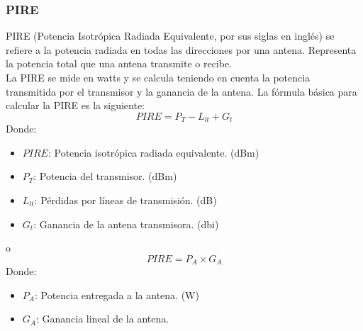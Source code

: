 \documentclass[
	12pt, %
	fleqn, %
	a4paper, %
	oneside, %
]{LegrandOrangeBook}
\begin{document}
\subsubsection{PIRE}
PIRE (Potencia Isotrópica Radiada Equivalente, por sus siglas en inglés) se refiere a la potencia radiada en todas las direcciones por una antena. Representa la potencia total que una antena transmite o recibe.\\
La PIRE se mide en watts y se calcula teniendo en cuenta la potencia transmitida por el transmisor y la ganancia de la antena. La fórmula básica para calcular la PIRE es la siguiente:
\begin{equation}
PIRE=P_T-L_{lt}+G_t
\end{equation}
Donde:
\begin{itemize}
\item $PIRE$: Potencia isotrópica radiada equivalente. (dBm)
\item $P_T$: Potencia del transmisor. (dBm)
\item $L_{lt}$: Pérdidas por líneas de transmisión. (dB)
\item $G_t$: Ganancia de la antena transmisora. (dbi)
\end{itemize}
o
\begin{equation}
PIRE=P_A\times G_A
\end{equation}
Donde:
\begin{itemize}
\item $P_A$: Potencia entregada a la antena. (W)
\item $G_A$: Ganancia lineal de la antena.
\end{itemize}
\end{document}
